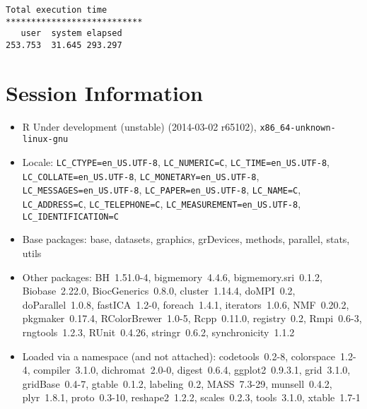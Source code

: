 \documentclass[10pt]{article}\usepackage[]{graphicx}\usepackage[]{color}
\begin{document}
\begin{verbatim}
Total execution time
***************************
   user  system elapsed 
253.753  31.645 293.297 

\end{verbatim}

\section*{Session Information}
\begin{itemize}\raggedright
  \item R Under development (unstable) (2014-03-02 r65102), \verb|x86_64-unknown-linux-gnu|
  \item Locale: \verb|LC_CTYPE=en_US.UTF-8|, \verb|LC_NUMERIC=C|, \verb|LC_TIME=en_US.UTF-8|, \verb|LC_COLLATE=en_US.UTF-8|, \verb|LC_MONETARY=en_US.UTF-8|, \verb|LC_MESSAGES=en_US.UTF-8|, \verb|LC_PAPER=en_US.UTF-8|, \verb|LC_NAME=C|, \verb|LC_ADDRESS=C|, \verb|LC_TELEPHONE=C|, \verb|LC_MEASUREMENT=en_US.UTF-8|, \verb|LC_IDENTIFICATION=C|
  \item Base packages: base, datasets, graphics, grDevices, methods,
    parallel, stats, utils
  \item Other packages: BH~1.51.0-4, bigmemory~4.4.6,
    bigmemory.sri~0.1.2, Biobase~2.22.0, BiocGenerics~0.8.0,
    cluster~1.14.4, doMPI~0.2, doParallel~1.0.8, fastICA~1.2-0,
    foreach~1.4.1, iterators~1.0.6, NMF~0.20.2, pkgmaker~0.17.4,
    RColorBrewer~1.0-5, Rcpp~0.11.0, registry~0.2, Rmpi~0.6-3,
    rngtools~1.2.3, RUnit~0.4.26, stringr~0.6.2, synchronicity~1.1.2
  \item Loaded via a namespace (and not attached): codetools~0.2-8,
    colorspace~1.2-4, compiler~3.1.0, dichromat~2.0-0, digest~0.6.4,
    ggplot2~0.9.3.1, grid~3.1.0, gridBase~0.4-7, gtable~0.1.2,
    labeling~0.2, MASS~7.3-29, munsell~0.4.2, plyr~1.8.1, proto~0.3-10,
    reshape2~1.2.2, scales~0.2.3, tools~3.1.0, xtable~1.7-1
\end{itemize}
\end{document}
